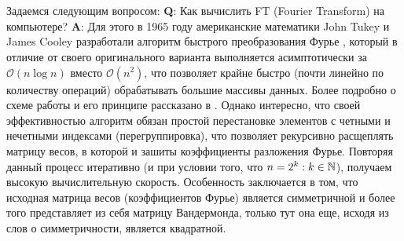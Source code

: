  \label{link::fft}
\\\\
\indent Задаемся следующим вопросом: \textbf{Q}: Как вычислить FT (Fourier Transform) на компьютере? \textbf{A}: Для этого в 1965 году американские математики John Tukey и James Cooley разработали алгоритм быстрого преобразования Фурье \cite{cooley1965algorithm}, который в отличие от своего оригинального варианта выполняется асимптотически за $\mathcal{O}(n \log n)$ вместо $\mathcal{O}(n^2)$, что позволяет крайне быстро (почти линейно по количеству операций) обрабатывать большие массивы данных. Более подробно о схеме работы и его принципе рассказано в \cite{brunton2022data}. Однако интересно, что своей эффективностью алгоритм обязан простой перестановке элементов с четными и нечетными индексами (перегруппировка), что позволяет рекурсивно расщеплять матрицу весов, в которой и зашиты коэффициенты разложения Фурье. Повторяя данный процесс итеративно (и при условии того, что $n = 2^k: k \in \mathbb{N}$), получаем высокую вычислительную скорость. Особенность заключается в том, что исходная матрица весов (коэффициентов Фурье) является симметричной и более того представляет из себя матрицу Вандермонда, только тут она еще, исходя из слов о симметричности, является квадратной. 